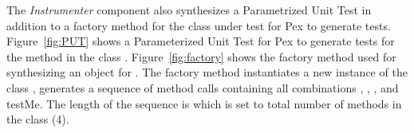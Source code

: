 	The \emph{Instrumenter} component also synthesizes a Parametrized Unit Test in addition to a factory method for the class under test for Pex to generate tests. Figure~\ref{fig:PUT} shows a Parameterized Unit Test for Pex to generate tests for the method  in the class . Figure~\ref{fig:factory} shows the factory method used for synthesizing an object for . The factory method instantiates a new instance of the class , generates a sequence of method calls containing all combinations , , , and testMe. The length of the sequence is  which is set to total number of methods in the class  (4).
	
	

